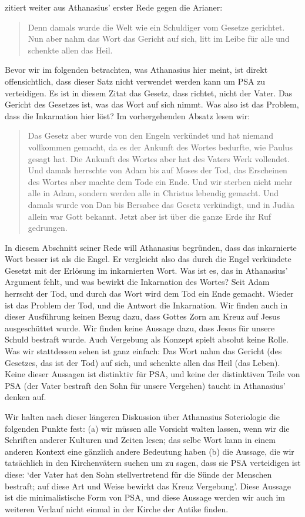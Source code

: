 \Cite{psa-in-church-history} zitiert weiter aus Athanasius' erster Rede gegen die Arianer:
\begin{quote}
	Denn damals wurde die Welt wie ein Schuldiger vom Gesetze gerichtet. Nun aber nahm das Wort das Gericht auf sich, litt im Leibe für alle und schenkte allen das Heil.
\end{quote}
Bevor wir im folgenden betrachten, was Athanasius hier meint, ist direkt offensichtlich, dass dieser Satz nicht verwendet werden kann um PSA zu verteidigen. Es ist in diesem Zitat das Gesetz, dass richtet, nicht der Vater.
Das Gericht des Gesetzes ist, was das Wort auf sich nimmt.
Was also ist das Problem, dass die Inkarnation hier löst?
Im vorhergehenden Absatz lesen wir:
\begin{quote}
Das Gesetz aber wurde von den Engeln verkündet und hat niemand vollkommen gemacht,
da es der Ankunft des Wortes bedurfte, wie Paulus gesagt hat.
Die Ankunft des Wortes aber hat des Vaters Werk vollendet. Und damals herrschte von Adam bis auf Moses der Tod,
das Erscheinen des Wortes aber machte dem Tode ein Ende.
Und wir sterben nicht mehr alle in Adam, sondern werden alle in Christus lebendig gemacht.
Und damals wurde von Dan bis Bersabee das Gesetz verkündigt, und in Judäa allein war Gott bekannt.
Jetzt aber ist über die ganze Erde ihr Ruf gedrungen.
\end{quote}
In diesem Abschnitt seiner Rede will Athanasius begründen, dass das inkarnierte Wort besser ist als die Engel.
Er vergleicht also das durch die Engel verkündete Gesetzt mit der Erlösung im inkarnierten Wort.
Was ist es, das in Athanasius' Argument fehlt, und was bewirkt die Inkarnation des Wortes?
Seit Adam herrscht der Tod, und durch das Wort wird dem Tod ein Ende gemacht.
Wieder ist das Problem der Tod, und die Antwort die Inkarnation.
Wir finden auch in dieser Ausführung keinen Bezug dazu, dass Gottes Zorn am Kreuz auf Jesus ausgeschüttet wurde.
Wir finden keine Aussage dazu, dass Jesus für unsere Schuld bestraft wurde.
Auch Vergebung als Konzept spielt absolut keine Rolle.
Was wir stattdessen sehen ist ganz einfach: Das Wort nahm das Gericht (des Gesetzes, das ist der Tod) auf sich, und schenkte allen das Heil (das Leben).
Keine dieser Aussagen ist distinktiv für PSA, und keine der distinktiven Teile von PSA (der Vater bestraft den Sohn für unsere Vergehen) taucht in Athanasius' denken auf.

Wir halten nach dieser längeren Diskussion über Athanasius Soteriologie die folgenden Punkte fest:
(a) wir müssen alle Vorsicht walten lassen, wenn wir die Schriften anderer Kulturen und Zeiten lesen; das selbe Wort kann in einem anderen Kontext eine gänzlich andere Bedeutung haben
(b) die Aussage, die wir tatsächlich in den Kirchenvätern suchen um zu sagen, dass sie PSA verteidigen ist diese: `der Vater hat den Sohn stellvertretend für die Sünde der Menschen bestraft; auf diese Art und Weise bewirkt das Kreuz Vergebung'.
Diese Aussage ist die minimalistische Form von PSA, und diese Aussage werden wir auch im weiteren Verlauf nicht einmal in der Kirche der Antike finden.

